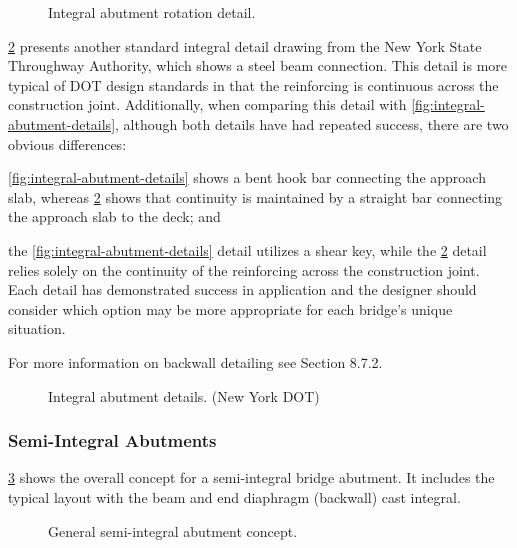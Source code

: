\begin{figure}
  \caption{ Integral abutment rotation detail.}
  \label{fig:integral-abutment-rotation-detail}
\end{figure}

\cref{fig:integral-abutment-details2} presents another standard integral detail drawing from the New York State Throughway Authority,
which shows a steel beam connection. This detail is more typical of DOT design standards in that the reinforcing is
continuous across the construction joint. Additionally, when comparing this detail with \cref{fig:integral-abutment-details}, although both
details have had repeated success, there are two obvious differences: 
\begin{enumerate*}
  \item \cref{fig:integral-abutment-details} shows a bent hook bar connecting the approach slab, whereas \cref{fig:integral-abutment-details2} shows that continuity is maintained by a straight bar connecting the approach slab to the deck; and 
  \item the \cref{fig:integral-abutment-details} detail utilizes a shear key, while the \cref{fig:integral-abutment-details2} detail relies solely on the continuity of the reinforcing across the construction joint. Each detail has demonstrated success in application and the designer should consider which option may be more appropriate for each bridge’s unique situation.
\end{enumerate*}

For more information on backwall detailing see Section 8.7.2.

\begin{figure}
  \caption{Integral abutment details. (New York DOT)}
  \label{fig:integral-abutment-details2}
\end{figure}

\subsubsection{Semi-Integral Abutments}
\cref{fig:semi-integral-abutment-concept} shows the overall concept for a semi-integral bridge abutment. It includes the typical layout with the beam and end diaphragm (backwall) cast integral.

\begin{figure}
  \caption{General semi-integral abutment concept.}
  \label{fig:semi-integral-abutment-concept}
\end{figure}


